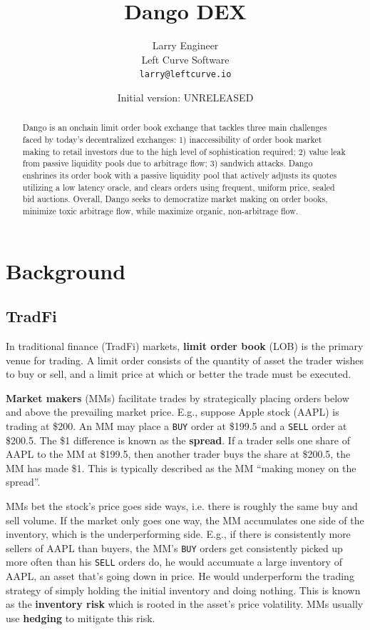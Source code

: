 \documentclass{article}
\title{Dango DEX}
\author{
  Larry Engineer \\
	Left Curve Software \\
	\texttt{larry@leftcurve.io} \\
}
\date{Initial version: UNRELEASED}
\begin{document}
\maketitle

\begin{abstract}
  Dango is an onchain limit order book exchange that tackles three main challenges faced by today's decentralized exchanges: 1) inaccessibility of order book market making to retail investors due to the high level of sophistication required; 2) value leak from passive liquidity pools due to arbitrage flow; 3) sandwich attacks. Dango enshrines its order book with a passive liquidity pool that actively adjusts its quotes utilizing a low latency oracle, and clears orders using frequent, uniform price, sealed bid auctions. Overall, Dango seeks to democratize market making on order books, minimize toxic arbitrage flow, while maximize organic, non-arbitrage flow.
\end{abstract}

\section{Background}

\subsection{TradFi}

In traditional finance (TradFi) markets, \textbf{limit order book} (LOB) is the primary venue for trading. A limit order consists of the quantity of asset the trader wishes to buy or sell, and a limit price at which or better the trade must be executed.

\textbf{Market makers} (MMs) facilitate trades by strategically placing orders below and above the prevailing market price. E.g., suppose Apple stock (AAPL) is trading at \$200. An MM may place a \texttt{BUY} order at \$199.5 and a \texttt{SELL} order at \$200.5. The \$1 difference is known as the \textbf{spread}. If a trader sells one share of AAPL to the MM at \$199.5, then another trader buys the share at \$200.5, the MM has made \$1. This is typically described as the MM ``making money on the spread''.

MMs bet the stock's price goes side ways, i.e. there is roughly the same buy and sell volume. If the market only goes one way, the MM accumulates one side of the inventory, which is the underperforming side. E.g., if there is consistently more sellers of AAPL than buyers, the MM's \texttt{BUY} orders get consistently picked up more often than his \texttt{SELL} orders do, he would accumuate a large inventory of AAPL, an asset that's going down in price. He would underperform the trading strategy of simply holding the initial inventory and doing nothing. This is known as the \textbf{inventory risk} which is rooted in the asset's price volatility. MMs usually use \textbf{hedging} to mitigate this risk.
\end{document}
